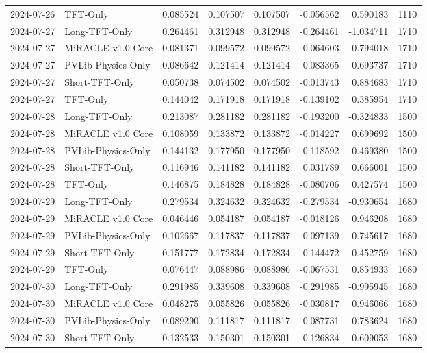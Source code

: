\begin{tabular}{llrrrrrr}
2024-07-26 & TFT-Only & 0.085524 & 0.107507 & 0.107507 & -0.056562 & 0.590183 & 1110 \\
2024-07-27 & Long-TFT-Only & 0.264461 & 0.312948 & 0.312948 & -0.264461 & -1.034711 & 1710 \\
2024-07-27 & MiRACLE v1.0 Core & 0.081371 & 0.099572 & 0.099572 & -0.064603 & 0.794018 & 1710 \\
2024-07-27 & PVLib-Physics-Only & 0.086642 & 0.121414 & 0.121414 & 0.083365 & 0.693737 & 1710 \\
2024-07-27 & Short-TFT-Only & 0.050738 & 0.074502 & 0.074502 & -0.013743 & 0.884683 & 1710 \\
2024-07-27 & TFT-Only & 0.144042 & 0.171918 & 0.171918 & -0.139102 & 0.385954 & 1710 \\
2024-07-28 & Long-TFT-Only & 0.213087 & 0.281182 & 0.281182 & -0.193200 & -0.324833 & 1500 \\
2024-07-28 & MiRACLE v1.0 Core & 0.108059 & 0.133872 & 0.133872 & -0.014227 & 0.699692 & 1500 \\
2024-07-28 & PVLib-Physics-Only & 0.144132 & 0.177950 & 0.177950 & 0.118592 & 0.469380 & 1500 \\
2024-07-28 & Short-TFT-Only & 0.116946 & 0.141182 & 0.141182 & 0.031789 & 0.666001 & 1500 \\
2024-07-28 & TFT-Only & 0.146875 & 0.184828 & 0.184828 & -0.080706 & 0.427574 & 1500 \\
2024-07-29 & Long-TFT-Only & 0.279534 & 0.324632 & 0.324632 & -0.279534 & -0.930654 & 1680 \\
2024-07-29 & MiRACLE v1.0 Core & 0.046446 & 0.054187 & 0.054187 & -0.018126 & 0.946208 & 1680 \\
2024-07-29 & PVLib-Physics-Only & 0.102667 & 0.117837 & 0.117837 & 0.097139 & 0.745617 & 1680 \\
2024-07-29 & Short-TFT-Only & 0.151777 & 0.172834 & 0.172834 & 0.144472 & 0.452759 & 1680 \\
2024-07-29 & TFT-Only & 0.076447 & 0.088986 & 0.088986 & -0.067531 & 0.854933 & 1680 \\
2024-07-30 & Long-TFT-Only & 0.291985 & 0.339608 & 0.339608 & -0.291985 & -0.995945 & 1680 \\
2024-07-30 & MiRACLE v1.0 Core & 0.048275 & 0.055826 & 0.055826 & -0.030817 & 0.946066 & 1680 \\
2024-07-30 & PVLib-Physics-Only & 0.089290 & 0.111817 & 0.111817 & 0.087731 & 0.783624 & 1680 \\
2024-07-30 & Short-TFT-Only & 0.132533 & 0.150301 & 0.150301 & 0.126834 & 0.609053 & 1680 \\

\end{tabular}
